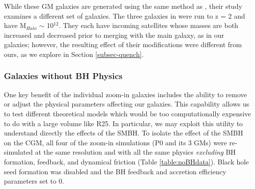 \documentclass[]{emulateapj}
\begin{document}


While these GM galaxies are generated using the same method as \cite{Pontzen2016}, their study examines a different set of galaxies. The three galaxies in \cite{Pontzen2016} were run to z = 2 and have M$_{Halo}$ $\sim$ 10$^{12}$. They each have incoming satellites whose masses are both increased and decreased prior to merging with the main galaxy, as in our galaxies; however, the resulting effect of their modifications were different from ours, as we explore in Section \ref{subsec-quench}.

\subsubsection{Galaxies without BH Physics}
One key benefit of the individual zoom-in galaxies includes the ability to remove or adjust the physical parameters affecting our galaxies. This capability allows us to test different theoretical models which would be too computationally expensive to do with a large volume like R25. In particular, we may exploit this utility to understand directly the effects of the SMBH. To isolate the effect of the SMBH on the CGM, all four of the zoom-in simulations (P0 and its 3 GMs) were re-simulated at the same resolution and with all the same physics \textit{excluding} BH formation, feedback, and dynamical friction (Table \ref{table:noBHdata}). Black hole seed formation was disabled and the BH feedback and accretion efficiency parameters set to 0.
\end{document}
